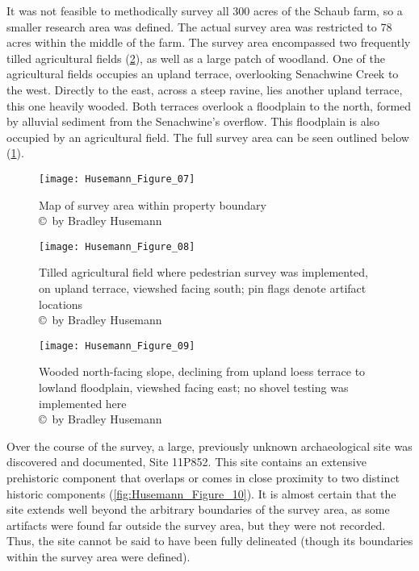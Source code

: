 It was not feasible to methodically survey all 300 acres of the Schaub farm, so a smaller research area was defined. The actual survey area was restricted to 78 acres within the middle of the farm. The survey area encompassed two frequently tilled agricultural fields (\cref{fig:Husemann_Figure_08}), as well as a large patch of woodland. One of the agricultural fields occupies an upland terrace, overlooking Senachwine Creek to the west. Directly to the east, across a steep ravine, lies another upland terrace, this one heavily wooded.  Both terraces overlook a floodplain to the north, formed by alluvial sediment from the Senachwine’s overflow. This floodplain is also occupied by an agricultural field.  The full survey area can be seen outlined below (\cref{fig:Husemann_Figure_07}).

\begin{figure}[!p]
	\texttt{[image: Husemann\_Figure\_07]}
	\caption{Map of survey area within property boundary
		{\normalfont\scriptsize \\ \copyright\ by Bradley Husemann
	}}
	\label{fig:Husemann_Figure_07}
\end{figure}

\begin{figure}[!p]
	\texttt{[image: Husemann\_Figure\_08]}
	\caption{Tilled agricultural field where pedestrian survey was implemented, on upland terrace, viewshed facing south; pin flags denote artifact locations
		{\normalfont\scriptsize \\ \copyright\ by Bradley Husemann
	}}
	\label{fig:Husemann_Figure_08}
\end{figure}

\begin{figure}[!p]
	\texttt{[image: Husemann\_Figure\_09]}
	\caption{Wooded north-facing slope, declining from upland loess terrace to lowland floodplain, viewshed facing east; no shovel testing was implemented here
		{\normalfont\scriptsize \\ \copyright\ by Bradley Husemann
	}}
	\label{fig:Husemann_Figure_09}
\end{figure}


Over the course of the survey, a large, previously unknown archaeological site was discovered and documented, Site 11P852. This site contains an extensive prehistoric component that overlaps or comes in close proximity to two distinct historic components (\cref{fig:Husemann_Figure_10}). It is almost certain that the site extends well beyond the arbitrary boundaries of the survey area, as some artifacts were found far outside the survey area, but they were not recorded. Thus, the site cannot be said to have been fully delineated (though its boundaries within the survey area were defined).

